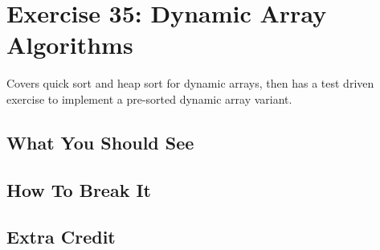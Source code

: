 \chapter{Exercise 35: Dynamic Array Algorithms}

Covers quick sort and heap sort for dynamic arrays, then has a test driven exercise to implement
a pre-sorted dynamic array variant.

\section{What You Should See}


\section{How To Break It}


\section{Extra Credit}



